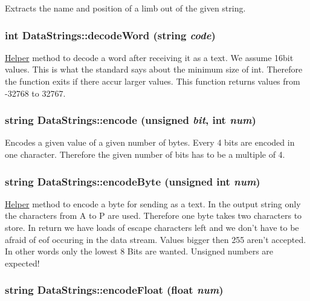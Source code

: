 \label{classDataStrings_a46f7f77ab083ffbd1a3835d71e4a0014}
Extracts the name and position of a limb out of the given string. \hypertarget{classDataStrings_aab412b1f14f0aa184be075cc7f3e1292}{
\subsubsection[{decodeWord}]{\setlength{\rightskip}{0pt plus 5cm}int DataStrings::decodeWord (string {\em code})}}
\label{classDataStrings_aab412b1f14f0aa184be075cc7f3e1292}
\hyperlink{classHelper}{Helper} method to decode a word after receiving it as a text. We assume 16bit values. This is what the standard says about the minimum size of int. Therefore the function exits if there accur larger values. This function returns values from -\/32768 to 32767. \hypertarget{classDataStrings_a2fcc2c42051507e518252c91980c3475}{
\subsubsection[{encode}]{\setlength{\rightskip}{0pt plus 5cm}string DataStrings::encode (unsigned {\em bit}, \/  int {\em num})}}
\label{classDataStrings_a2fcc2c42051507e518252c91980c3475}
Encodes a given value of a given number of bytes. Every 4 bits are encoded in one character. Therefore the given number of bits has to be a multiple of 4. \hypertarget{classDataStrings_a49277265d8e3452b66a32b6ee3df84f1}{
\subsubsection[{encodeByte}]{\setlength{\rightskip}{0pt plus 5cm}string DataStrings::encodeByte (unsigned int {\em num})}}
\label{classDataStrings_a49277265d8e3452b66a32b6ee3df84f1}
\hyperlink{classHelper}{Helper} method to encode a byte for sending as a text. In the output string only the characters from A to P are used. Therefore one byte takes two characters to store. In return we have loads of escape characters left and we don't have to be afraid of eof occuring in the data stream. Values bigger then 255 aren't accepted. In other words only the lowest 8 Bits are wanted. Unsigned numbers are expected! \hypertarget{classDataStrings_a416919ab32b17ec1ded450e5e80fb05f}{
\subsubsection[{encodeFloat}]{\setlength{\rightskip}{0pt plus 5cm}string DataStrings::encodeFloat (float {\em num})}}
